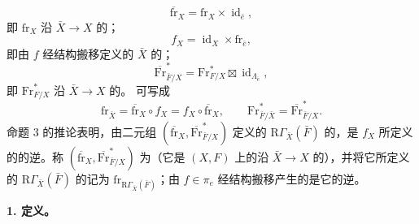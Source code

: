 \[
\overline{\mathrm{fr}}_X=\mathrm{fr}_X\times\operatorname{id}_{\bar e},
\]
即 $\mathrm{fr}_X$ 沿 $\bar X\to X$ 的；
\[
f_X=\operatorname{id}_X\times\mathrm{fr}_{\bar e},
\]
即由 $f$ 经结构搬移定义的 $\bar X$ 的；
\[
\overline{\mathrm{Fr}}_{\bar F/X}^{*}=\mathrm{Fr}_{F/X}^{*}\boxtimes\operatorname{id}_{\Lambda_{\bar e}},
\]
即 $\mathrm{Fr}_{F/X}^{*}$ 沿 $\bar X\to X$ 的。
可写成
\[
\mathrm{fr}_{\bar X}=\overline{\mathrm{fr}}_X\circ f_X=f_X\circ\overline{\mathrm{fr}}_X,
\qquad \mathrm{Fr}_{\bar F/\bar X}^{*}=\overline{\mathrm{Fr}}_{\bar F/X}^{*}.
\]
命题 3 的推论表明，由二元组 $(\overline{\mathrm{fr}}_X,\overline{\mathrm{Fr}}_{\bar F/X}^{*})$ 定义的 $\mathrm R\Gamma_{\bar X}(\bar F)$ 的，是 $f_X$ 所定义的的逆。称 $(\overline{\mathrm{fr}}_X,\overline{\mathrm{Fr}}_{\bar F/X}^{*})$ 为（它是 $(X,F)$ 上的沿 $\bar X\to X$ 的），并将它所定义的 $\mathrm R\Gamma_{\bar X}(\bar F)$ 的记为 $\mathrm{fr}_{\mathrm R\Gamma_{\bar X}(\bar F)}$；由 $f\in\pi_e$ 经结构搬移产生的是它的逆。

\textbf{1. 定义。}

